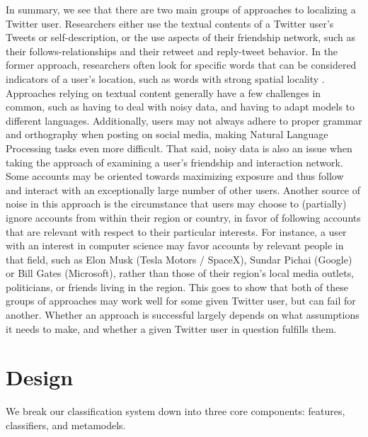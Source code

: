 \documentclass[10pt,a4paper]{article}
\begin{document}
In summary, we see that there are two main groups of approaches to localizing a Twitter user. Researchers either use the textual contents of a Twitter user's Tweets or self-description, or the use aspects of their friendship network, such as their follows-relationships and their retweet and reply-tweet behavior. In the former approach, researchers often look for specific words that can be considered indicators of a user's location, such as words with strong spatial locality \cite{ryoo14a}. Approaches relying on textual content generally have a few challenges in common, such as having to deal with noisy data, and having to adapt models to different languages. Additionally, users may not always adhere to proper grammar and orthography when posting on social media, making Natural Language Processing tasks even more difficult. That said, noisy data is also an issue when taking the approach of examining a user's friendship and interaction network. Some accounts may be oriented towards maximizing exposure and thus follow and interact with an exceptionally large number of other users. Another source of noise in this approach is the circumstance that users may choose to (partially) ignore accounts from within their region or country, in favor of following accounts that are relevant with respect to their particular interests. For instance, a user with an interest in computer science may favor accounts by relevant people in that field, such as Elon Musk (Tesla Motors / SpaceX), Sundar Pichai (Google) or Bill Gates (Microsoft), rather than those of their region's local media outlets, politicians, or friends living in the region. This goes to show that both of these groups of approaches may work well for some given Twitter user, but can fail for another. Whether an approach is successful largely depends on what assumptions it needs to make, and whether a given Twitter user in question fulfills them.

\section{Design}
We break our classification system down into three core components: features, classifiers, and metamodels.
\end{document}
